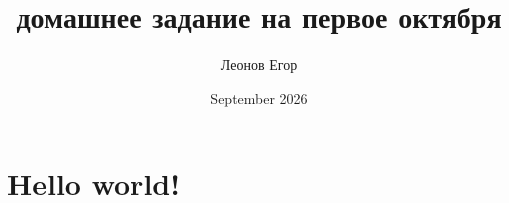 \documentclass{article}
\title{домашнее задание на первое октября}
\author{Леонов Егор }
\date{September 2026}
\begin{document}
\maketitle

\section{Hello world!}
\end{document}
